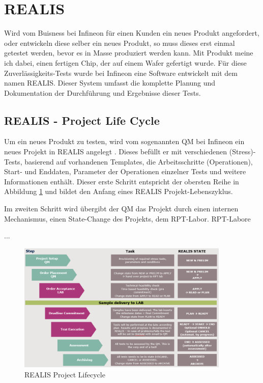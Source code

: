 \section{REALIS}\label{Sec:REALIS}

Wird vom Buisness bei Infineon für einen Kunden ein neues Produkt angefordert, oder entwickeln diese selber ein neues Produkt, so muss dieses erst einmal getestet werden, bevor es in Masse produziert werden kann. Mit Produkt meine ich dabei, einen fertigen Chip, der auf einem Wafer gefertigt wurde. Für diese Zuverlässigkeits-Tests wurde bei Infineon eine Software entwickelt mit dem namen \acf{REALIS}. Dieser System umfasst die komplette Planung und Dokumentation der Durchführung und Ergebnisse dieser Tests. 



\subsection{REALIS - Project Life Cycle}

Um ein neues Produkt zu testen, wird vom sogenannten \ac{QM} bei Infineon ein neues Projekt in \ac{REALIS} angelegt . Dieses befüllt er mit verschiedenen (Stress)-Tests, basierend auf vorhandenen Templates, die Arbeitsschritte (Operationen), Start- und Enddaten, Parameter der Operationen einzelner Tests und weitere Informationen enthält. Dieser erste Schritt entspricht der obersten Reihe in Abbildung \ref{fig:realis-project-lifecycle} und bildet den Anfang eines REALIS Projekt-Lebenszyklus.

Im zweiten Schritt wird übergibt der \ac{QM} das Projekt durch einen internen Mechanismus, einen State-Change des Projekts, dem \ac{RPT}-Labor. RPT-Labore 


...

\begin{figure}[!h]
    \centering
    \includegraphics[width=0.9\textwidth]{bilder/realis-project-lifecycle.png}
    \caption{REALIS Project Lifecycle}
    \label{fig:realis-project-lifecycle}
\end{figure}
